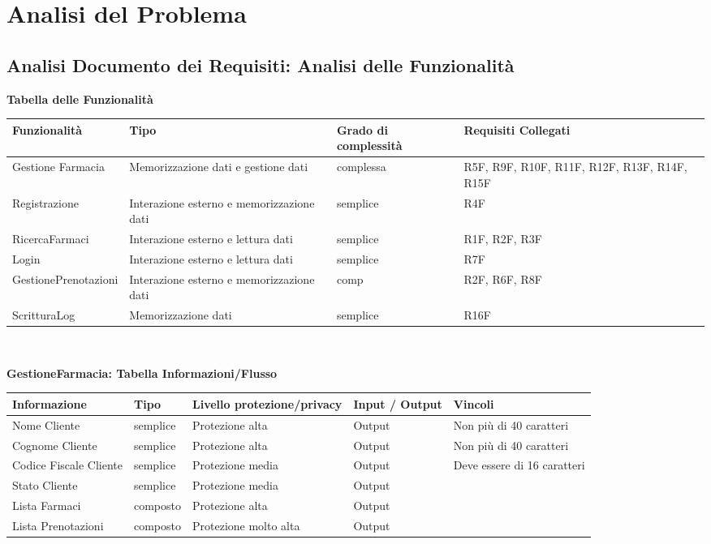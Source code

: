 \newpage
\section{Analisi del Problema}
\subsection{Analisi Documento dei Requisiti: Analisi delle Funzionalità}
\hfill \break

\textbf{Tabella delle Funzionalità}
\\

\begin{tabular} {|P{4cm}|P{4cm}|P{3.5cm}|P{4cm}|} %
    \hline
    \textbf{Funzionalità} & \textbf{Tipo} & \textbf{Grado di complessità} & \textbf{Requisiti Collegati} \\
    \hline
    Gestione Farmacia & Memorizzazione dati e gestione dati & complessa & R5F, R9F, R10F, R11F, R12F, R13F, R14F, R15F \\
    \hline
    Registrazione & Interazione esterno e memorizzazione dati & semplice & R4F \\
    \hline
    RicercaFarmaci  &  Interazione esterno e lettura dati  &  semplice  &   R1F, R2F, R3F \\
    \hline
    Login  &  Interazione esterno e lettura dati  &  semplice  &   R7F \\
    \hline
    GestionePrenotazioni  &  Interazione esterno e memorizzazione dati  &  comp  &   R2F, R6F, R8F \\
    \hline
    ScritturaLog  &  Memorizzazione dati  &  semplice  &   R16F \\
    \hline
\end{tabular}
\\
\hfill \break

\textbf{GestioneFarmacia: Tabella Informazioni/Flusso}
\\

\begin{tabular} {|P{3cm}|P{3cm}|P{3cm}|P{3cm}|P{3cm}|}
    \hline
    \textbf{Informazione} & \textbf{Tipo} & \textbf{Livello protezione/privacy} & \textbf{Input / Output} & \textbf{Vincoli}\\
    \hline
    Nome Cliente & semplice & Protezione alta & Output & Non più di 40 caratteri \\
    \hline
    Cognome Cliente & semplice & Protezione alta & Output & Non più di 40 caratteri \\
    \hline
    Codice Fiscale Cliente & semplice & Protezione media & Output & Deve essere di 16 caratteri \\
    \hline
    Stato Cliente & semplice & Protezione media & Output & \\
    \hline
    Lista Farmaci & composto & Protezione alta & Output & \\
    \hline
    Lista Prenotazioni & composto & Protezione molto alta & Output & \\
    \hline
\end{tabular}
\hfill \break

